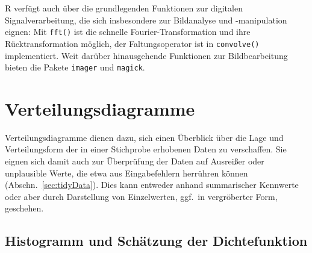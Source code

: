 R verfügt auch über die grundlegenden Funktionen zur digitalen Signalverarbeitung, die sich insbesondere zur Bildanalyse und -manipulation eignen: Mit  \lstinline!fft()! ist die schnelle Fourier-Transformation und ihre Rücktransformation möglich, der Faltungsoperator ist in \lstinline!convolve()! implementiert. Weit darüber hinausgehende Funktionen zur Bildbearbeitung bieten die Pakete \lstinline!imager! und \lstinline!magick!.

\section{Verteilungsdiagramme}
\label{sec:distDiag}

Verteilungsdiagramme dienen dazu, sich einen Überblick über die Lage und Verteilungsform der in einer Stichprobe erhobenen Daten zu verschaffen. Sie eignen sich damit auch zur Überprüfung der Daten auf Ausreißer oder unplausible Werte, die etwa aus Eingabefehlern herrühren können (Abschn.\ \ref{sec:tidyData}). Dies kann entweder anhand summarischer Kennwerte oder aber durch Darstellung von Einzelwerten, ggf.\ in vergröberter Form, geschehen.

\subsection{Histogramm und Schätzung der Dichtefunktion}
\label{sec:hist}

